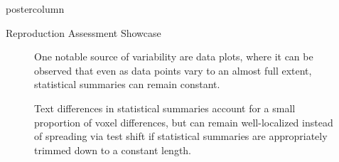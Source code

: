\begin{frame}
\begin{columns}
\begin{column}{.59\textwidth}
\begin{beamercolorbox}[center]{postercolumn}
\begin{minipage}{.98\textwidth}
{\begin{myblock}{Reproduction Assessment Showcase}
\begin{minipage}{.58\textwidth}
\begin{figure}
							\vspace{0.2em}
							\caption{
								One notable source of variability are data plots, where it can be observed that even as data points vary to an almost full extent, statistical summaries can remain constant.
							}
						\end{figure}
						\end{minipage}
						\hfill
						\begin{minipage}{.38\textwidth}
						\vspace{1.3em}
						\begin{figure}
							\vspace{0.5em}
							\caption{
								Text differences in statistical summaries account for a small proportion of voxel differences, but can remain well-localized instead of spreading via test shift if statistical summaries are appropriately trimmed down to a constant length.
							}
						\end{figure}
						\begin{figure}

\end{figure}
\end{minipage}
\end{myblock}}
\end{minipage}
\end{beamercolorbox}
\end{column}
\end{columns}
\end{frame}
